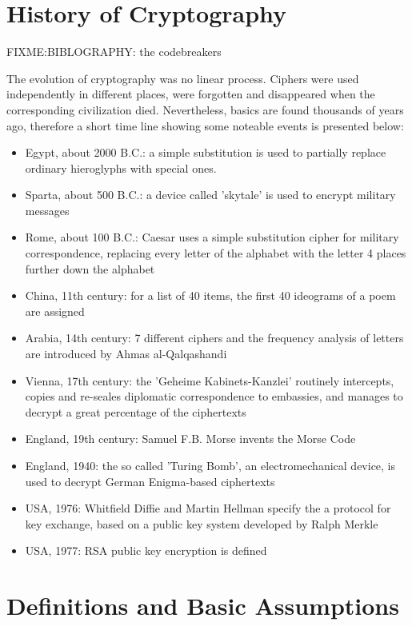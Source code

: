\section{History of Cryptography}
FIXME:BIBLOGRAPHY: the codebreakers

The evolution of cryptography was no linear process. Ciphers were used independently in different
places, were forgotten and disappeared when the corresponding civilization died. Nevertheless,
basics are found thousands of years ago, therefore a short time line showing some noteable
events is presented below:

\begin{itemize}
 \item Egypt, about 2000 B.C.: a simple substitution is used to partially replace ordinary hieroglyphs with special ones. 
 \item Sparta, about 500 B.C.: a device called 'skytale' is used to encrypt military messages
 \item Rome, about 100 B.C.: Caesar uses a simple substitution cipher for military correspondence, replacing every
 letter of the alphabet with the letter 4 places further down the alphabet
 \item China, 11th century: for a list of 40 items, the first 40 ideograms of a poem are assigned
 \item Arabia, 14th century: 7 different ciphers and the frequency analysis of letters are
 introduced by Ahmas al-Qalqashandi
 \item Vienna, 17th century: the 'Geheime Kabinets-Kanzlei' routinely intercepts, copies and 
 re-seales diplomatic correspondence to embassies, and manages to decrypt a great percentage of the ciphertexts   
 \item England, 19th century: Samuel F.B. Morse invents the Morse Code
 \item England, 1940: the so called 'Turing Bomb', an electromechanical device, is used to decrypt
 German Enigma-based ciphertexts
 \item USA, 1976: Whitfield Diffie and Martin Hellman specify the a protocol for key exchange,
 based on a public key system developed by Ralph Merkle
 \item USA, 1977: RSA public key encryption is defined
 \end{itemize}

 
\section{Definitions and Basic Assumptions}


